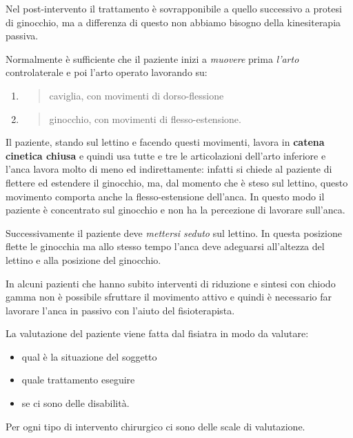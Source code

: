 Nel post-intervento il trattamento è sovrapponibile a quello successivo
a protesi di ginocchio, ma a differenza di questo non abbiamo bisogno
della kinesiterapia passiva.

Normalmente è sufficiente che il paziente inizi a \emph{muovere} prima
\emph{l'arto} controlaterale e poi l'arto operato lavorando su:

\begin{enumerate}
\def\labelenumi{\arabic{enumi}.}
\item
  \begin{quote}
  caviglia, con movimenti di dorso-flessione
  \end{quote}
\item
  \begin{quote}
  ginocchio, con movimenti di flesso-estensione.
  \end{quote}
\end{enumerate}

Il paziente, stando sul lettino e facendo questi movimenti, lavora in
\textbf{catena cinetica chiusa} e quindi usa tutte e tre le
articolazioni dell'arto inferiore e l'anca lavora molto di meno ed
indirettamente: infatti si chiede al paziente di flettere ed estendere
il ginocchio, ma, dal momento che è steso sul lettino, questo movimento
comporta anche la flesso-estensione dell'anca. In questo modo il
paziente è concentrato sul ginocchio e non ha la percezione di lavorare
sull'anca.

Successivamente il paziente deve \emph{mettersi seduto} sul lettino. In
questa posizione flette le ginocchia ma allo stesso tempo l'anca deve
adeguarsi all'altezza del lettino e alla posizione del ginocchio.

In alcuni pazienti che hanno subito interventi di riduzione e sintesi
con chiodo gamma non è possibile sfruttare il movimento attivo e quindi
è necessario far lavorare l'anca in passivo con l'aiuto del
fisioterapista.

La valutazione del paziente viene fatta dal fisiatra in modo da
valutare:

\begin{itemize}
\item
  qual è la situazione del soggetto
\item
  quale trattamento eseguire
\item
  se ci sono delle disabilità.
\end{itemize}

Per ogni tipo di intervento chirurgico ci sono delle scale di
valutazione.

